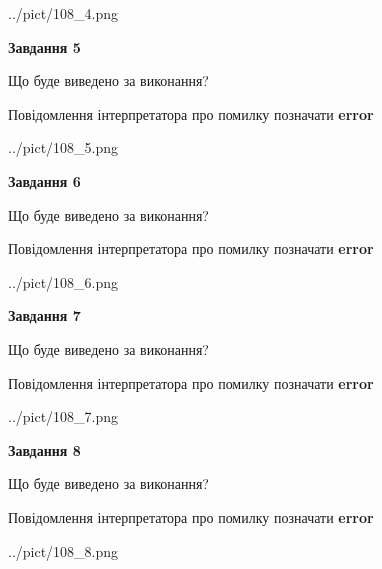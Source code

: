 \documentclass[12pt, ukrainian]{article}
\begin{document}
{\begin{center}
	{../pict/108_4.png}
\end{center}
\newpage

{\begin {center}\textbf{Завдання 5}\end {center}}\par
Що буде виведено за виконання? \par
Повідомлення інтерпретатора про помилку позначати \textbf{error}

\begin{center}
	{../pict/108_5.png}
\end{center}
\newpage

{\begin {center}\textbf{Завдання 6}\end {center}}\par
Що буде виведено за виконання? \par
Повідомлення інтерпретатора про помилку позначати \textbf{error}

\begin{center}
	{../pict/108_6.png}
\end{center}
\newpage

{\begin {center}\textbf{Завдання 7}\end {center}}\par
Що буде виведено за виконання? \par
Повідомлення інтерпретатора про помилку позначати \textbf{error}

\begin{center}
	{../pict/108_7.png}
\end{center}
\newpage

{\begin {center}\textbf{Завдання 8}\end {center}}\par
Що буде виведено за виконання? \par
Повідомлення інтерпретатора про помилку позначати \textbf{error}

\begin{center}
	{../pict/108_8.png}
\end{center}
\newpage

}
\end{document}
